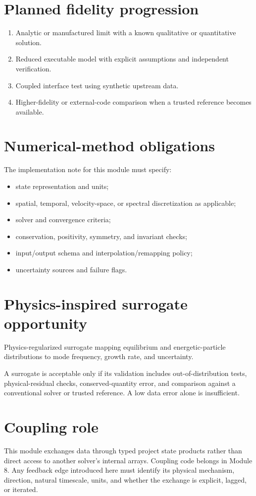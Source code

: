 \documentclass[11pt]{article}
\begin{document}
\section{Planned fidelity progression}
\begin{enumerate}[leftmargin=1.6em]
\item Analytic or manufactured limit with a known qualitative or quantitative solution.
\item Reduced executable model with explicit assumptions and independent verification.
\item Coupled interface test using synthetic upstream data.
\item Higher-fidelity or external-code comparison when a trusted reference becomes available.
\end{enumerate}

\section{Numerical-method obligations}
The implementation note for this module must specify:
\begin{itemize}[leftmargin=1.6em]
\item state representation and units;
\item spatial, temporal, velocity-space, or spectral discretization as applicable;
\item solver and convergence criteria;
\item conservation, positivity, symmetry, and invariant checks;
\item input/output schema and interpolation/remapping policy;
\item uncertainty sources and failure flags.
\end{itemize}

\section{Physics-inspired surrogate opportunity}
Physics-regularized surrogate mapping equilibrium and energetic-particle distributions to mode frequency, growth rate, and uncertainty.

A surrogate is acceptable only if its validation includes out-of-distribution tests, physical-residual checks, conserved-quantity error, and comparison against a conventional solver or trusted reference. A low data error alone is insufficient.

\section{Coupling role}
This module exchanges data through typed project state products rather than direct access to another solver's internal arrays. Coupling code belongs in Module 8. Any feedback edge introduced here must identify its physical mechanism, direction, natural timescale, units, and whether the exchange is explicit, lagged, or iterated.
\end{document}
